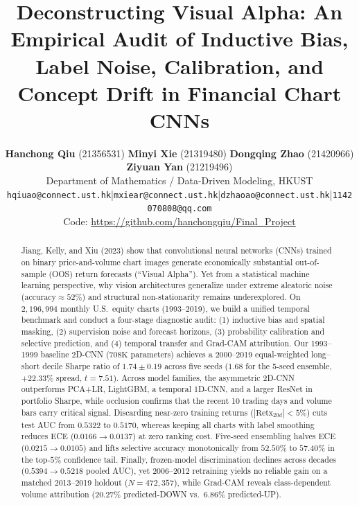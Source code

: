 \documentclass[10pt]{article}
\title{Deconstructing Visual Alpha: An Empirical Audit of Inductive Bias, Label Noise, Calibration, and Concept Drift in Financial Chart CNNs}
\author{
  \textbf{Hanchong Qiu} (21356531) \quad
  \textbf{Minyi Xie} (21319480) \quad
  \textbf{Dongqing Zhao} (21420966) \quad
  \textbf{Ziyuan Yan} (21219496) \\[2pt]
  Department of Mathematics / Data-Driven Modeling, HKUST \\
  \footnotesize\texttt{hqiuao@connect.ust.hk}\;\;|\;\;\texttt{mxiear@connect.ust.hk}\;\;|\;\;\texttt{dzhaoao@connect.ust.hk}\;\;|\;\;\texttt{1142070808@qq.com} \\
  \footnotesize Code: \url{https://github.com/hanchongqiu/Final_Project}
}
\begin{document}
\maketitle

\begin{abstract}
Jiang, Kelly, and Xiu (2023) show that convolutional neural networks (CNNs) trained on binary price-and-volume chart images generate economically substantial out-of-sample (OOS) return forecasts (``Visual Alpha''). Yet from a statistical machine learning perspective, why vision architectures generalize under extreme aleatoric noise ($\text{accuracy} \approx 52\%$) and structural non-stationarity remains underexplored. On $2,196,994$ monthly U.S.\ equity charts (1993--2019), we build a unified temporal benchmark and conduct a four-stage diagnostic audit: (1) inductive bias and spatial masking, (2) supervision noise and forecast horizons, (3) probability calibration and selective prediction, and (4) temporal transfer and Grad-CAM attribution. Our 1993--1999 baseline 2D-CNN ($708\text{K}$ parameters) achieves a 2000--2019 equal-weighted long--short decile Sharpe ratio of $1.74 \pm 0.19$ across five seeds ($1.68$ for the 5-seed ensemble, $+22.33\%$ spread, $t = 7.51$). Across model families, the asymmetric 2D-CNN outperforms PCA+LR, LightGBM, a temporal 1D-CNN, and a larger ResNet in portfolio Sharpe, while occlusion confirms that the recent 10 trading days and volume bars carry critical signal. Discarding near-zero training returns ($|\text{Retx}_{20d}| < 5\%$) cuts test AUC from $0.5322$ to $0.5170$, whereas keeping all charts with label smoothing reduces ECE ($0.0166 \to 0.0137$) at zero ranking cost. Five-seed ensembling halves ECE ($0.0215 \to 0.0105$) and lifts selective accuracy monotonically from $52.50\%$ to $57.40\%$ in the top-$5\%$ confidence tail. Finally, frozen-model discrimination declines across decades ($0.5394 \to 0.5218$ pooled AUC), yet 2006--2012 retraining yields no reliable gain on a matched 2013--2019 holdout ($N = 472,357$), while Grad-CAM reveals class-dependent volume attribution ($20.27\%$ predicted-DOWN vs.\ $6.86\%$ predicted-UP).
\end{abstract}

\end{document}
